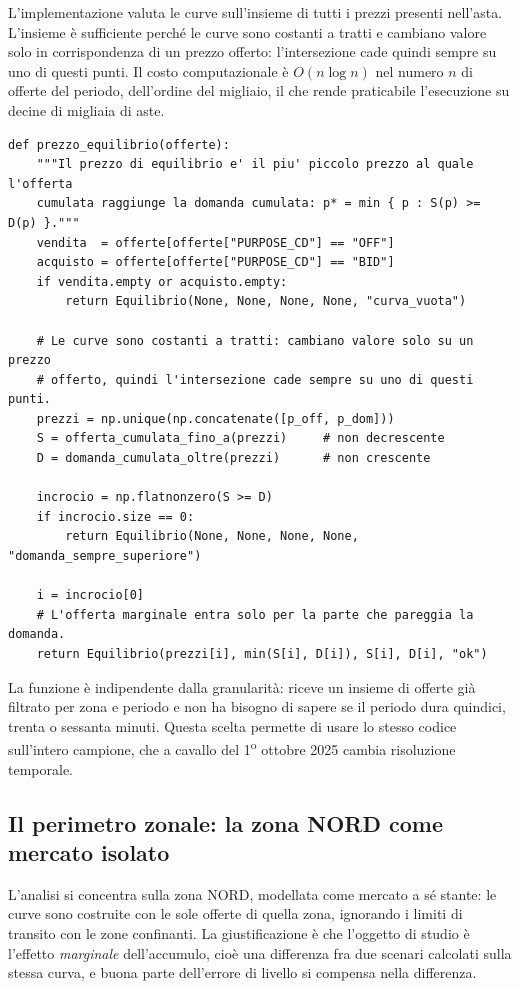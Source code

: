 L'implementazione valuta le curve sull'insieme di tutti i prezzi presenti nell'asta.
L'insieme \`e sufficiente perch\'e le curve sono costanti a tratti e cambiano valore solo in
corrispondenza di un prezzo offerto: l'intersezione cade quindi sempre su uno di questi
punti. Il costo computazionale \`e $O(n \log n)$ nel numero $n$ di offerte del periodo,
dell'ordine del migliaio, il che rende praticabile l'esecuzione su decine di migliaia di
aste.

\begin{lstlisting}[caption={Ricerca del prezzo di equilibrio (\texttt{src/mgp/curve.py}).},
                   label={lst:clearing}]
def prezzo_equilibrio(offerte):
    """Il prezzo di equilibrio e' il piu' piccolo prezzo al quale l'offerta
    cumulata raggiunge la domanda cumulata: p* = min { p : S(p) >= D(p) }."""
    vendita  = offerte[offerte["PURPOSE_CD"] == "OFF"]
    acquisto = offerte[offerte["PURPOSE_CD"] == "BID"]
    if vendita.empty or acquisto.empty:
        return Equilibrio(None, None, None, None, "curva_vuota")

    # Le curve sono costanti a tratti: cambiano valore solo su un prezzo
    # offerto, quindi l'intersezione cade sempre su uno di questi punti.
    prezzi = np.unique(np.concatenate([p_off, p_dom]))
    S = offerta_cumulata_fino_a(prezzi)     # non decrescente
    D = domanda_cumulata_oltre(prezzi)      # non crescente

    incrocio = np.flatnonzero(S >= D)
    if incrocio.size == 0:
        return Equilibrio(None, None, None, None, "domanda_sempre_superiore")

    i = incrocio[0]
    # L'offerta marginale entra solo per la parte che pareggia la domanda.
    return Equilibrio(prezzi[i], min(S[i], D[i]), S[i], D[i], "ok")
\end{lstlisting}

La funzione \`e indipendente dalla granularit\`a: riceve un insieme di offerte gi\`a filtrato
per zona e periodo e non ha bisogno di sapere se il periodo dura quindici, trenta o sessanta
minuti. Questa scelta permette di usare lo stesso codice sull'intero campione, che a cavallo
del 1\textsuperscript{o} ottobre 2025 cambia risoluzione temporale.

\subsection{Il perimetro zonale: la zona NORD come mercato isolato}
\label{sec:perimetro}

L'analisi si concentra sulla zona NORD, modellata come mercato a s\'e stante: le curve sono
costruite con le sole offerte di quella zona, ignorando i limiti di transito con le zone
confinanti. La giustificazione \`e che l'oggetto di studio \`e l'effetto \emph{marginale}
dell'accumulo, cio\`e una differenza fra due scenari calcolati sulla stessa curva, e buona
parte dell'errore di livello si compensa nella differenza.

